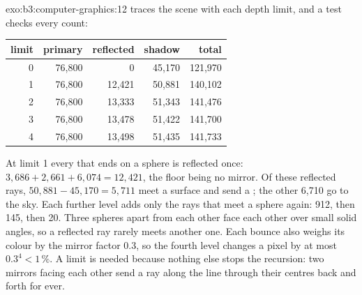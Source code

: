 \begin{solution}{exo:b3:computer-graphics:12}
 traces the scene with each depth limit, and a test checks every count:
\begin{center}
\begin{tabular}{rrrrr}
\hline
limit & primary & reflected & shadow & total \\
\hline
0 & 76{,}800 & 0 & 45{,}170 & 121{,}970 \\
1 & 76{,}800 & 12{,}421 & 50{,}881 & 140{,}102 \\
2 & 76{,}800 & 13{,}333 & 51{,}343 & 141{,}476 \\
3 & 76{,}800 & 13{,}478 & 51{,}422 & 141{,}700 \\
4 & 76{,}800 & 13{,}498 & 51{,}435 & 141{,}733 \\
\hline
\end{tabular}
\end{center}
At limit 1 every  that ends on a sphere is reflected once: $3{,}686 + 2{,}661 + 6{,}074 = 12{,}421$, the floor being no mirror. Of these reflected rays, $50{,}881 - 45{,}170 = 5{,}711$ meet a surface and send a ; the other 6,710 go to the sky. Each further level adds only the rays that meet a sphere again: 912, then 145, then 20. Three spheres apart from each other face each other over small solid angles, so a reflected ray rarely meets another one. Each bounce also weighs its colour by the mirror factor 0.3, so the fourth level changes a pixel by at most $0.3^4 < 1\,\%$. A limit is needed because nothing else stops the recursion: two mirrors facing each other send a ray along the line through their centres back and forth for ever.

\end{solution}

